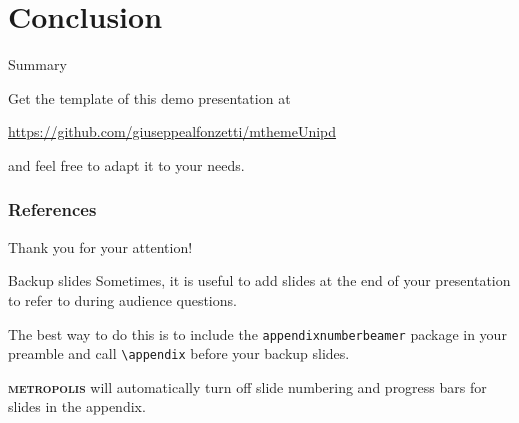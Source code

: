 \documentclass[aspectratio=169, 15pt]{beamer}
\newcommand{\metro}{\textbf{\textsc{metropolis}}\xspace}
\begin{document}
\section{Conclusion}

\begin{frame}{Summary}

  Get the template of this demo presentation at

  \begin{center}\url{https://github.com/giuseppealfonzetti/mthemeUnipd}\end{center}

  and feel free to adapt it to your needs.

\end{frame}
\begin{frame}[allowframebreaks]
        \frametitle{References}
        \footnotesize
    \printbibliography[heading=none]
\end{frame}
\appendix
{
\begin{frame}[standout]
  Thank you for your attention!
\end{frame}
}
\begin{frame}[fragile]{Backup slides}
  Sometimes, it is useful to add slides at the end of your presentation to
  refer to during audience questions.

  The best way to do this is to include the \verb|appendixnumberbeamer|
  package in your preamble and call \verb|\appendix| before your backup slides.

  \metro will automatically turn off slide numbering and progress bars for
  slides in the appendix.
\end{frame}
\end{document}
